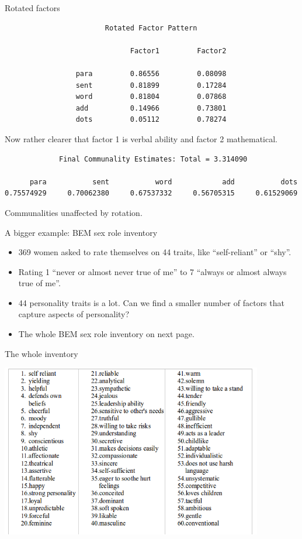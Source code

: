\documentclass[pdf]{prosper}
\begin{document}
\begin{slide}{Rotated factors}

{\scriptsize
\begin{verbatim}
                        Rotated Factor Pattern
 
                              Factor1         Factor2

                 para         0.86556         0.08098
                 sent         0.81899         0.17284
                 word         0.81804         0.07868
                 add          0.14966         0.73801
                 dots         0.05112         0.78274
\end{verbatim}
}

Now rather clearer that factor 1 is verbal ability and factor 2 mathematical.

{\scriptsize
\begin{verbatim}
             Final Communality Estimates: Total = 3.314090
 
      para           sent           word            add           dots
0.75574929     0.70062380     0.67537332     0.56705315     0.61529069
\end{verbatim}
}

Communalities unaffected by rotation.
  
\end{slide}

\begin{slide}{A bigger example: BEM sex role inventory}

  \begin{itemize}
  \item 369 women asked to rate themselves on 44 traits, like ``self-reliant'' or ``shy''.
  \item Rating 1 ``never or almost never true of me'' to 7 ``always or almost always true of me''.
  \item 44 personality traits is a lot. Can we find a smaller number of factors that capture aspects of personality?
  \item The whole BEM sex role inventory on next page.
  \end{itemize}
  
\end{slide}

\begin{slide}{The whole inventory}

{\centering
\includegraphics[width=4.5in]{bem}
  }

\end{slide}
\end{document}
